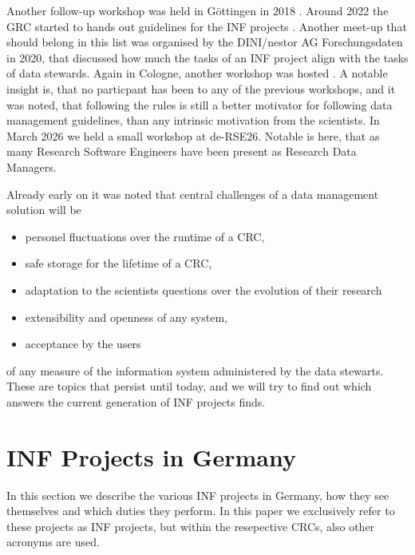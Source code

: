 \documentclass{eceasst}
\begin{document}
Another follow-up workshop was held in Göttingen in 2018 \cite{Roertgen2019}.
Around 2022 the GRC started to hands out guidelines for the INF projects \cite{bastian_2025}.
Another meet-up that should belong in this list was organised by the DINI/nestor AG Forschungsdaten in 2020\cite{Rizzolli_2021},
that discussed how much the tasks of an INF project align with the tasks of data stewards.
Again in Cologne, another workshop was hosted \cite{bastian_2025}. A notable insight is, that no particpant has been to any
of the previous workshops, and it was noted, that following the rules is still a better motivator for following data
management guidelines, than any intrinsic motivation from the scientists.
In March 2026 we held a small workshop at de-RSE26. Notable is here, that as many Research Software Engineers have been present
as Research Data Managers.

Already early on \cite{mueckschel2006} it was noted that central challenges of a data management solution will be
\begin{itemize}
 \item personel fluctuations over the runtime of a CRC,
 \item safe storage for the lifetime of a CRC,
 \item adaptation to the scientists questions over the evolution of their research
 \item extensibility and openness of any system,
 \item acceptance by the users
\end{itemize}
of any measure of the information system administered by the data stewarts.
These are topics that persist until today,
and we will try to find out which answers the current generation of INF projects finds.


\section{INF Projects in Germany}
In this section we describe the various INF projects in Germany, how they see themselves and which duties they perform.
In this paper we exclusively refer to these projects as INF projects, but within the resepective CRCs, also other acronyms are used.
\end{document}
